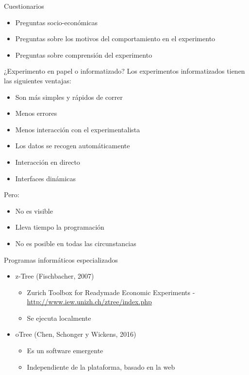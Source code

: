 \documentclass[
  ignorenonframetext,
]{beamer}
\providecommand{\tightlist}{%
  \setlength{\itemsep}{0pt}\setlength{\parskip}{0pt}}
\begin{document}
\begin{frame}{Cuestionarios}
\protect\hypertarget{cuestionarios}{}
\begin{itemize}
\item
  Preguntas socio-económicas
\item
  Preguntas sobre los motivos del comportamiento en el experimento
\item
  Preguntas sobre comprensión del experimento
\end{itemize}
\end{frame}

\begin{frame}{¿Experimento en papel o informatizado?}
\protect\hypertarget{experimento-en-papel-o-informatizado}{}
Los experimentos informatizados tienen las siguientes ventajas:

\begin{itemize}
\item
  Son más simples y rápidos de correr
\item
  Menos errores
\item
  Menos interacción con el experimentalista
\item
  Los datos se recogen automáticamente
\item
  Interacción en directo
\item
  Interfaces dinámicas
\end{itemize}

Pero:

\begin{itemize}
\item
  No es visible
\item
  Lleva tiempo la programación
\item
  No es posible en todas las circunstancias
\end{itemize}
\end{frame}

\begin{frame}{Programas informáticos especializados}
\protect\hypertarget{programas-informuxe1ticos-especializados}{}
\begin{itemize}
\tightlist
\item
  z-Tree (Fischbacher, 2007)

  \begin{itemize}
  \tightlist
  \item
    Zurich Toolbox for Readymade Economic Experiments -
    \url{http://www.iew.unizh.ch/ztree/index.php}
  \item
    Se ejecuta localmente
  \end{itemize}
\item
  oTree (Chen, Schonger y Wickens, 2016)

  \begin{itemize}
  \tightlist
  \item
    Es un software emergente
  \item
    Independiente de la plataforma, basado en la web
  \end{itemize}
\end{itemize}
\end{frame}
\end{document}
